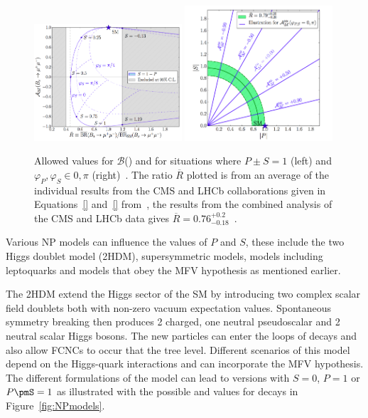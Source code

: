 \begin{figure}[tbp]
    \centering
        \includegraphics[width=0.49\textwidth]{./Figs/Theory/NP_P_pm_S_1.png}        
        \includegraphics[width=0.49\textwidth]{./Figs/Theory/NP_phi.png}
    \caption{Allowed values for $\mathcal{B}$(\bsmumu) and \ADG for situations where $P \pm S = 1$ (left) and $\varphi_P, \varphi_S \in {0, \pi}$ (right)~\cite{Buras:2013uqa,Knegjens:2014zva}. The ratio $\overline{R}$ plotted is from an average of the individual results from the CMS and LHCb collaborations given in Equations~\ref{} and~\ref{} from~\cite{CMSandLHCbCollaborations:2013pla}, the results from the combined analysis of the CMS and LHCb data gives $\overline{R} = 0.76^{+0.2}_{-0.18}$~\cite{CMS:2014xfa}.}
    \label{fig:NPmodelsB}
\end{figure}


Various NP models can influence the values of $P$ and $S$, these include the two Higgs doublet model (2HDM), supersymmetric models, models including leptoquarks and models that obey the MFV hypothesis as mentioned earlier.

The 2HDM extend the Higgs sector of the SM by introducing two complex scalar field doublets both with non-zero vacuum expectation values. Spontaneous symmetry breaking then produces 2 charged, one neutral pseudoscalar and 2 neutral scalar Higgs bosons. The new particles can enter the loops of \bmumu decays and also allow FCNCs to occur that the tree level. Different scenarios of this model depend on the Higgs-quark interactions and can incorporate the MFV hypothesis. The different formulations of the model can lead to versions with $S=0$, $P=1$ or $P\pmS = 1$ as illustrated with the possible \BF and \ADG values for \bsmumu decays in Figure~\ref{fig:NPmodels}.

